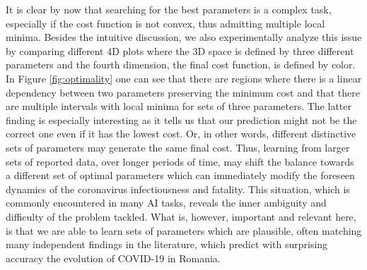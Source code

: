 \documentclass[11pt]{article}
\begin{document}
It is clear by now that searching for the best parameters is a complex task, especially if the cost function is not convex, thus admitting multiple local minima. Besides the intuitive discussion, we also experimentally analyze this issue by comparing different 4D plots where the 3D space is defined by three different parameters and the fourth dimension, the final cost function, is defined by color. In Figure \ref{fig:optimality} one can see that there are regions where there is a linear dependency between two parameters preserving the minimum cost and that there are multiple intervals with local minima for sets of three parameters. The latter finding is especially interesting as it tells us that our prediction might not be the correct one even if it has the lowest cost. Or, in other words, different distinctive sets of parameters may generate the same final cost. Thus, learning from larger sets of reported data, over longer periods of time, may shift the balance towards a different set of optimal parameters which can immediately modify the foreseen dynamics of the coronavirus infectiousness and fatality. This situation, which is commonly encountered in many AI tasks, reveals the inner ambiguity and difficulty of the problem tackled. What is, however, important and relevant here, is that we are able to learn sets of parameters which are plausible, often matching many independent findings in the literature, which predict with surprising accuracy the evolution of COVID-19 in Romania.
\end{document}

